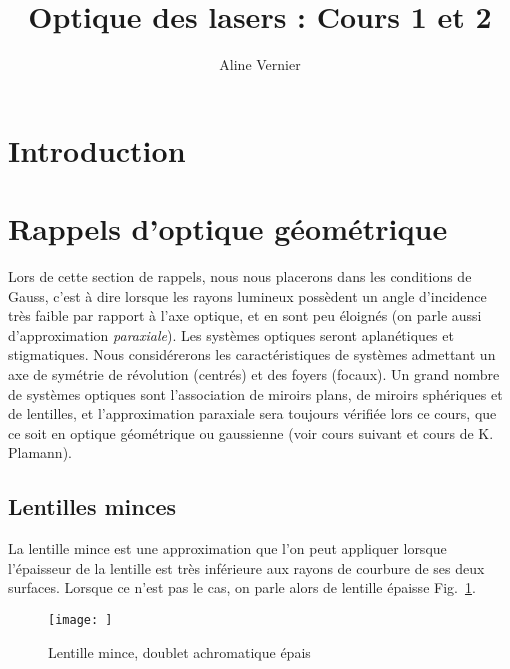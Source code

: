 \documentclass[a4paper]{article}
\title{Optique des lasers : Cours 1 et 2}
\author{Aline Vernier}
\date{}
\begin{document}
\maketitle

\section{Introduction}


\section{Rappels d'optique géométrique}
Lors de cette section de rappels, nous nous placerons dans les conditions de Gauss, c'est à dire lorsque les rayons lumineux possèdent un angle d'incidence très faible par rapport à l'axe optique, et en sont peu éloignés (on parle aussi d'approximation \textit{paraxiale}). Les systèmes optiques seront aplanétiques et stigmatiques. Nous considérerons les caractéristiques de systèmes admettant un axe de symétrie de révolution (centrés) et des foyers (focaux). Un grand nombre de systèmes optiques sont l’association de miroirs plans, de miroirs sphériques et de lentilles, et l'approximation paraxiale sera toujours vérifiée lors ce cours, que ce soit en optique géométrique ou gaussienne (voir cours suivant et cours de K. Plamann). 

\subsection{Lentilles minces}

La lentille mince est une approximation que l'on peut appliquer lorsque l'épaisseur de la lentille est très inférieure aux rayons de courbure de ses deux surfaces. Lorsque ce n'est pas le cas, on parle alors de lentille épaisse Fig.~\ref{fig:lentille_mince}. 
\begin{figure}[!htbp]
\label{fig:lentille_mince}
\begin{center}
\texttt{[image: ]}
\end{center}
\caption{Lentille mince, doublet achromatique épais}
\end{figure}
\end{document}
